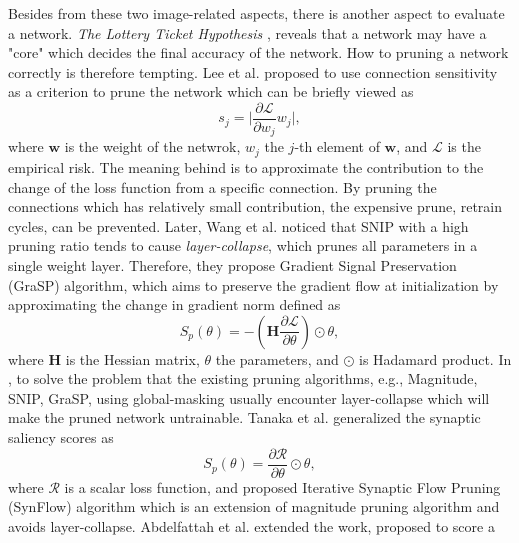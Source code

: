\documentclass[sigconf]{acmart}
\begin{document}
    Besides from these two image-related aspects, there is another aspect to evaluate  
    a network. 
    \textit{The Lottery Ticket Hypothesis} \cite{frankle2019lottery}, reveals that a 
    network may have a "core" which decides the final accuracy of the network. 
    How to pruning a network correctly is therefore tempting. Lee et al. 
    \cite{lee2019snip} proposed to use connection sensitivity as a criterion to prune 
    the network which can be briefly viewed as 
    \begin{equation}
        \label{equ:snip_connection_sensitivity}
        s_j=\lvert \frac{\partial \mathcal L}{\partial w_j}w_j\rvert,
    \end{equation}
    where $\textbf{w}$ is the weight of the netwrok, $w_j$ the $j$-th element of 
    $\textbf{w}$, and $\mathcal L$ is the empirical risk. The meaning behind is to approximate the contribution 
    to the change of the loss function from a specific connection. By pruning the 
    connections which has relatively small contribution, the expensive prune, retrain 
    cycles, can be prevented. 
    Later, Wang et al. \cite{wang2020picking} noticed that SNIP with a high pruning ratio 
    tends to cause \textit{layer-collapse}, which prunes all parameters in a single weight 
    layer. Therefore, they propose Gradient Signal Preservation (GraSP) algorithm, which 
    aims to preserve the gradient flow at initialization by approximating the change in 
    gradient norm defined as 
    \begin{equation}
        \label{equ:grap}
        S_p(\theta)=-(\textbf{H}\frac{\partial \mathcal L}{\partial \theta})\odot\theta,
    \end{equation}
    where $\textbf{H}$ is the Hessian matrix, $\theta$ the parameters, and $\odot$ is Hadamard product. 
    In \cite{tanaka2020pruning}, to solve the problem that the existing pruning algorithms, e.g., 
    Magnitude, SNIP, GraSP, using global-masking usually encounter layer-collapse which will make 
    the pruned network untrainable. 
    Tanaka et al. generalized the synaptic saliency scores as 
    \begin{equation}
        \label{equ:synflow}
        S_p(\theta)=\frac{\partial \mathcal R}{\partial \theta}\odot\theta,
    \end{equation}
    where $\mathcal R$ is a scalar loss function, and proposed Iterative Synaptic Flow Pruning (SynFlow) 
    algorithm which is an extension of magnitude pruning algorithm and avoids layer-collapse. 
    Abdelfattah et al. \cite{abdelfattah2021zerocost} extended the work, proposed to score a 
\end{document}
